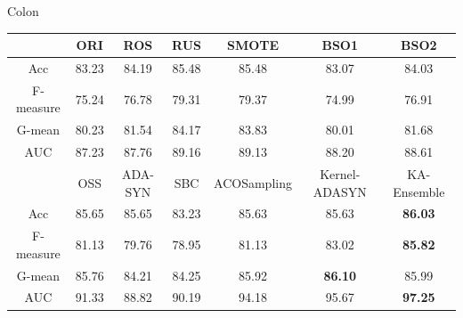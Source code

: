 \documentclass[10pt]{beamer}
\begin{document}
\begin{frame}{Colon}

\begin{table}[!h]
  	\centering
      \scriptsize
	\begin{tabular}{c|c|c|c|c|c|c}
    \toprule[1.5pt]
    \hline
    			&ORI	&ROS	&RUS	&SMOTE	&BSO1	&BSO2	\\ 
	\hline
    Acc			&83.23	&84.19	&85.48	&85.48	&83.07	&84.03	\\
    \hline
     F-measure	&75.24	&76.78	&79.31	&79.37	&74.99	&76.91\\
	\hline
    G-mean		&80.23	&81.54	&84.17	&83.83	&80.01	&81.68	\\
	\hline
    AUC			&87.23	&87.76	&89.16	&89.13	&88.20	&88.61\\

        \midrule[1.2pt]

                &OSS	&ADA-SYN	&SBC	&ACOSampling	&Kernel-ADASYN	&KA-Ensemble\\
	\hline
    Acc			&85.65	&85.65		&83.23	&85.63		&85.63	&\textbf{86.03}\\
    \hline
     F-measure	&81.13	&79.76		&78.95	&81.13		&83.02	&\textbf{85.82}\\
	\hline
    G-mean		&85.76	&84.21	&84.25	&85.92	&\textbf{86.10}	&85.99	\\
	\hline
    AUC			&91.33	&88.82	&90.19	&94.18		&95.67	&\textbf{97.25}\\
    	\hline
\bottomrule[1.2pt]
    \end{tabular}
\end{table}

\end{frame}
\end{document}
